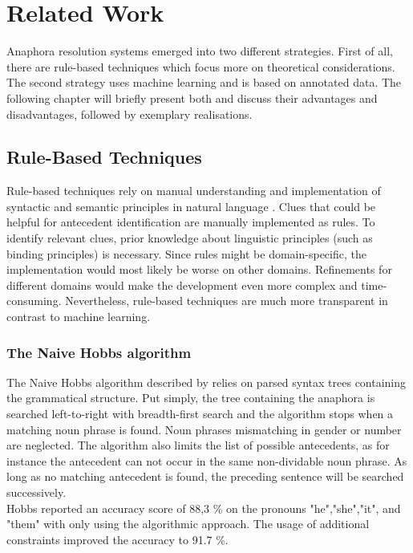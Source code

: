 \chapter{Related Work}
\label{sec:Related Work}

Anaphora resolution systems emerged into two different strategies. First of all, there are rule-based techniques which focus more on theoretical considerations. The second strategy uses machine learning and is based on annotated data. The following chapter will briefly present both and discuss their advantages and disadvantages, followed by exemplary realisations.

\section{Rule-Based Techniques}
Rule-based techniques rely on manual understanding and implementation of syntactic and semantic principles in natural language \citep{kennedy1996anaphora,mitkov1994integrated,ingria1989computational}. Clues that could be helpful for antecedent identification are manually implemented as rules. To identify relevant clues, prior knowledge about linguistic principles (such as binding principles) is necessary. Since rules might be domain-specific, the implementation would most likely be worse on other domains. Refinements for different domains would make the development even more complex and time-consuming. Nevertheless, rule-based techniques are much more transparent in contrast to machine learning.



\subsection{The Naive Hobbs algorithm}
The Naive Hobbs algorithm described by \citep{hobbs1978resolving} relies on parsed syntax trees containing the grammatical structure. Put simply, the tree containing the anaphora is searched left-to-right with breadth-first search and the algorithm stops when a matching noun phrase is found. Noun phrases mismatching in gender or number are neglected. The algorithm also limits the list of possible antecedents, as for instance the antecedent can not occur in the same non-dividable noun phrase. As long as no matching antecedent is found, the preceding sentence will be searched successively. \\
Hobbs reported an accuracy score of 88,3 \% on the pronouns "he","she","it", and "them" with only using the algorithmic approach. The usage of additional constraints improved the accuracy to 91.7 \%.

